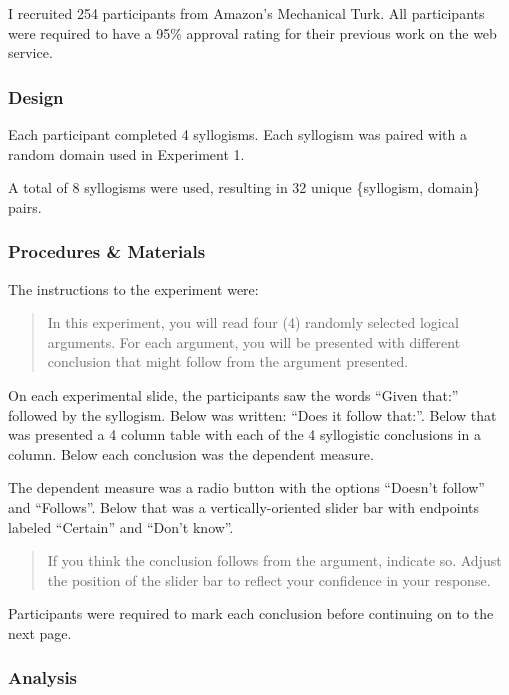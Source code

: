 \documentclass{llncs} %
\begin{document}
I recruited 254 participants from Amazon's Mechanical Turk. All participants were required to have a 95\% approval rating for their previous work on the web service. 

\subsubsection{Design}

Each participant completed 4 syllogisms. Each syllogism was paired with a random domain used in Experiment 1.

A total of 8 syllogisms were used, resulting in 32 unique \{syllogism, domain\} pairs.

\subsubsection{Procedures \& Materials}

The instructions to the experiment were:

\begin{quotation}
In this experiment, you will read four (4) randomly selected logical arguments. For each argument, you will be presented with different conclusion that might follow from the argument presented.
\end{quotation}

On each experimental slide, the participants saw the words ``Given that:'' followed by the syllogism. Below was written: ``Does it follow that:''. Below that was presented a 4 column table with each of the 4 syllogistic conclusions in a column. Below each conclusion was the dependent measure.

The dependent measure was a radio button with the options ``Doesn't follow'' and ``Follows''. Below that was a vertically-oriented slider bar with endpoints labeled ``Certain'' and ``Don't know''. 

\begin{quotation}
If you think the conclusion follows from the argument, indicate so. Adjust the position of the slider bar to reflect your confidence in your response.
\end{quotation}

Participants were required to mark each conclusion before continuing on to the next page.

\subsubsection{Analysis}
\end{document}
